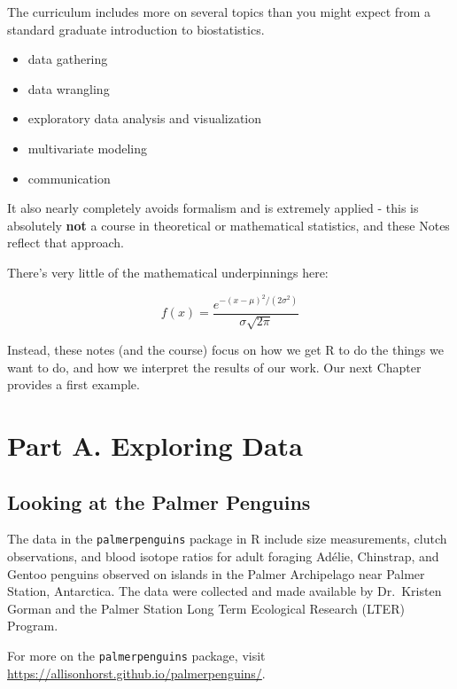 \documentclass[
]{book}
\providecommand{\tightlist}{%
  \setlength{\itemsep}{0pt}\setlength{\parskip}{0pt}}
\begin{document}
The curriculum includes more on several topics than you might expect from a standard graduate introduction to biostatistics.

\begin{itemize}
\tightlist
\item
  data gathering
\item
  data wrangling
\item
  exploratory data analysis and visualization
\item
  multivariate modeling
\item
  communication
\end{itemize}

It also nearly completely avoids formalism and is extremely applied - this is absolutely \textbf{not} a course in theoretical or mathematical statistics, and these Notes reflect that approach.

There's very little of the mathematical underpinnings here:

\[
f(x) = \frac{e^{-(x - \mu)^{2}/(2\sigma^{2})}}{\sigma{\sqrt{2 \pi }}} 
\]

Instead, these notes (and the course) focus on how we get R to do the things we want to do, and how we interpret the results of our work. Our next Chapter provides a first example.

\hypertarget{part-part-a.-exploring-data}{%
\part*{Part A. Exploring Data}\label{part-part-a.-exploring-data}}

\hypertarget{looking-at-the-palmer-penguins}{%
\chapter{Looking at the Palmer Penguins}\label{looking-at-the-palmer-penguins}}

The data in the \texttt{palmerpenguins} package in R include size measurements, clutch observations, and blood isotope ratios for adult foraging Adélie, Chinstrap, and Gentoo penguins observed on islands in the Palmer Archipelago near Palmer Station, Antarctica. The data were collected and made available by Dr.~Kristen Gorman and the Palmer Station Long Term Ecological Research (LTER) Program.

For more on the \texttt{palmerpenguins} package, visit \url{https://allisonhorst.github.io/palmerpenguins/}.
\end{document}
